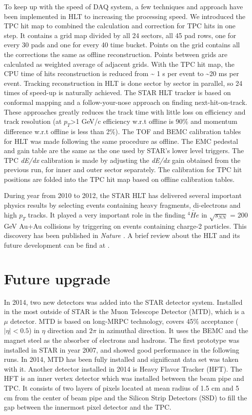 To keep up with the speed of DAQ system, a few techniques and approach
have been implemented in HLT to increasing the processing speed. We
introduced the TPC hit map to combined the calculation and correction
for TPC hits in one step. It contains a grid map divided by all 24
sectors, all 45 pad rows, one for every 30 pads and one for every
40 time bucket. Points on the grid contains all the corrections the
same as offline reconstruction. Points between grids are calculated
as weighted average of adjacent grids. With the TPC hit map, the CPU
time of hits reconstruction is reduced from \textasciitilde{} 1 s
per event to \textasciitilde{}20 ms per event. Tracking reconstruction
in HLT is done sector by sector in parallel, so 24 times of speed-up
is naturally achieved. The STAR HLT tracker is based on conformal
mapping \cite{Adler2003778} and a follow-your-nose approach on finding
next-hit-on-track. These approaches greatly reduces the track time
with little loss on efficiency and track resolution (at $p_{T}$>1
GeV/c efficiency w.r.t offline is 90\% and momentum difference w.r.t
offline is less than 2\%). The TOF and BEMC calibration tables for
HLT was made following the same procedure as offline. The EMC pedestal
and gain table are the same as the one used by STAR's lower level
triggers. The TPC \emph{dE/dx }calibration is made by adjusting the
\emph{dE/dx }gain obtained from the previous run, for inner and outer
sector separately. The calibration for TPC hit positions are folded
into the TPC hit map based on offline calibration tables.

During year from 2010 to 2012, the STAR HLT has delivered several
important physics results by selecting events containing heavy fragments,
di-electrons and high $p_{T}$ tracks. It played a very important
role in the finding $\bar{^{4}He}$ in $\sqrt{s_{NN}}$ = 200 GeV
Au+Au collisions by triggering on events containing charge-2 particles.
This discovery has been published in \emph{Nature \cite{:2011qf}.
}A brief review about the HLT and its future development can be find
at \cite{Ke:2013uq}.


\section{Future upgrade}

In 2014, two new detectors was added into the STAR detector system.
Installed in the most outside of STAR is the Muon Telescope Detector
(MTD), which is a $\mu$ detector. MTD is based on long-MRPC technology,
covers 45\% acceptance ($|\eta|<0.5$) in $\eta$ direction and $2\pi$
in azimuthal direction. It uses the BEMC and the magnet steel as the
absorber of electrons and hadrons. The first prototype was installed
in STAR in year 2007, and showed good performance in the following
runs. In 2014, MTD has been fully installed and significant data set
was taken with it. Another detector installed in 2014 is Heavy Flavor
Tracker (HFT). The HFT is an inner vertex detector which was installed
between the beam pipe and TPC. It consists of two layers of pixels
located at mean radius of 1.5 cm and 5 cm from the center of beam
pipe and the Silicon Strip Detectors (SSD) to fill the gap between
the innermost pixel detector and the TPC. 
